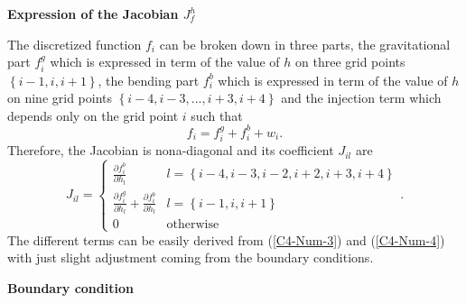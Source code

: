 \vspace{.5cm}    \textbf{Expression   of    the   Jacobian    $J_f^h$}
\vspace{.5cm}

The discretized  function $f_i$ can be broken down in three parts, the
gravitational part $f_i^{g}$  which is expressed in term  of the value
of $h$ on three  grid points $\left\{{i-1,i,i+1}\right\}$, the bending
part $f_i^{b}$ which is expressed in term  of the value of $h$ on nine
grid points  $\left\{{i-4,i-3,...,i+3,i+4}\right\}$ and  the injection
term which depends only on the grid point $i$ such that
\begin{equation}
  f_i = f_i^g+f_i^b+w_i.
\end{equation}
Therefore, the Jacobian is  nona-diagonal and its coefficient $J_{il}$
are
\begin{equation}
  J_{il}=
  \begin{cases}
    \frac{\partial f^{b}_i}{\partial h_{l}} &
    l = \left\{{i-4,i-3,i-2,i+2,i+3,i+4}\right\}\\
    \frac{\partial       f^{g}_i}{\partial       h_{l}}+\frac{\partial
      f^{b}_i}{\partial h_{l}} & l =
    \left\{{i-1,i,i+1}\right\}\\
    0 & \text{otherwise}
  \end{cases}.
  \label{C4-C2-eq12}
\end{equation}
The different  terms can be  easily derived from  (\ref{C4-Num-3}) and
(\ref{C4-Num-4}) with just slight  adjustment coming from the boundary
conditions.

\vspace{.5cm} \textbf{Boundary condition} \vspace{.5cm}

